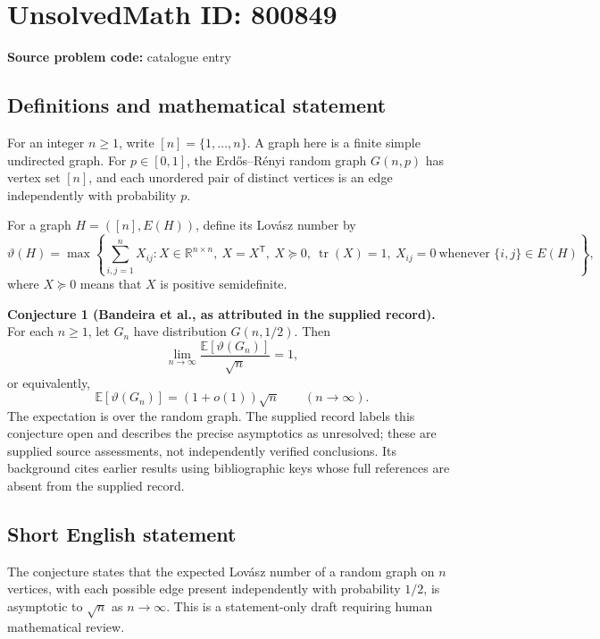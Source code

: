\documentclass[11pt]{article}
\newcommand{\R}{\mathbb{R}}
\begin{document}
\section*{UnsolvedMath ID: 800849}
\textbf{Source problem code:} catalogue entry
\subsection{Definitions and mathematical statement}
For an integer \(n\geq 1\), write \([n]=\{1,\ldots,n\}\). A graph here is a finite simple undirected graph. For \(p\in[0,1]\), the Erd\H{o}s--R\'enyi random graph \(G(n,p)\) has vertex set \([n]\), and each unordered pair of distinct vertices is an edge independently with probability \(p\).

For a graph \(H=([n],E(H))\), define its Lov\'asz number by
\[
\vartheta(H)=\max\left\{\sum_{i,j=1}^{n}X_{ij}: X\in\R^{n\times n},\ X=X^{\mathsf T},\ X\succeq0,\ \operatorname{tr}(X)=1,\ X_{ij}=0\ \text{whenever }\{i,j\}\in E(H)\right\},
\]
where \(X\succeq0\) means that \(X\) is positive semidefinite.

\textbf{Conjecture 1 (Bandeira et al., as attributed in the supplied record).} For each \(n\geq1\), let \(G_n\) have distribution \(G(n,1/2)\). Then
\[
\lim_{n\to\infty}\frac{\mathbb E[\vartheta(G_n)]}{\sqrt n}=1,
\]
or equivalently,
\[
\mathbb E[\vartheta(G_n)]=(1+o(1))\sqrt n\qquad(n\to\infty).
\]
The expectation is over the random graph. The supplied record labels this conjecture open and describes the precise asymptotics as unresolved; these are supplied source assessments, not independently verified conclusions. Its background cites earlier results using bibliographic keys whose full references are absent from the supplied record.
\subsection{Short English statement}
The conjecture states that the expected Lov\'asz number of a random graph on \(n\) vertices, with each possible edge present independently with probability \(1/2\), is asymptotic to \(\sqrt n\) as \(n\to\infty\). This is a statement-only draft requiring human mathematical review.
\end{document}
